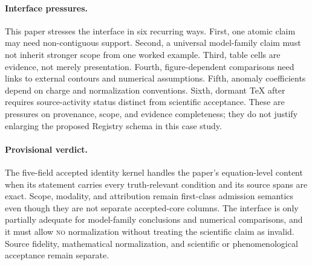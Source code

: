 \paragraph{Interface pressures.}
This paper stresses the interface in six recurring ways. First, one atomic
claim may need non-contiguous support. Second, a universal model-family claim
must not inherit stronger scope from one worked example. Third, table cells
are evidence, not merely presentation. Fourth, figure-dependent comparisons
need links to external contours and numerical assumptions. Fifth, anomaly
coefficients depend on charge and normalization conventions. Sixth, dormant
TeX after \verb|| requires source-activity status distinct from
scientific acceptance. These are pressures on provenance, scope, and evidence
completeness; they do not justify enlarging the proposed Registry schema in
this case study.

\paragraph{Provisional verdict.}
The five-field accepted identity kernel handles the paper's equation-level
content when its statement carries every truth-relevant condition and its
source spans are exact. Scope, modality, and attribution remain first-class
admission semantics even though they are not separate accepted-core columns.
The interface is only partially adequate for model-family conclusions and
numerical comparisons, and it must allow \textsc{no} normalization without
treating the scientific claim as invalid. Source fidelity, mathematical
normalization, and scientific or phenomenological acceptance remain separate.